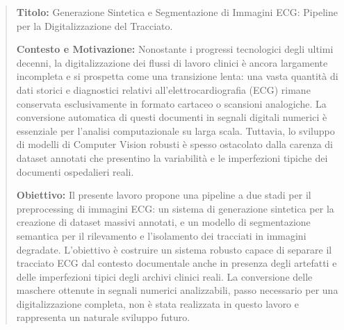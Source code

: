 \begin{abstract}
\textbf{Titolo:} Generazione Sintetica e Segmentazione di Immagini ECG: Pipeline per la Digitalizzazione del Tracciato.

\vspace{0.5cm}

\noindent \textbf{Contesto e Motivazione:} Nonostante i progressi tecnologici degli ultimi decenni, la digitalizzazione dei flussi di lavoro clinici è ancora largamente incompleta e si prospetta come una transizione lenta: una vasta quantità di dati storici e diagnostici relativi all'elettrocardiografia (ECG) rimane conservata esclusivamente in formato cartaceo o scansioni analogiche. La conversione automatica di questi documenti in segnali digitali numerici è essenziale per l'analisi computazionale su larga scala. Tuttavia, lo sviluppo di modelli di Computer Vision robusti è spesso ostacolato dalla carenza di dataset annotati che presentino la variabilità e le imperfezioni tipiche dei documenti ospedalieri reali.

\vspace{0.2cm}

\noindent \textbf{Obiettivo:} Il presente lavoro propone una pipeline a due stadi per il preprocessing di immagini ECG: un sistema di generazione sintetica per la creazione di dataset massivi annotati, e un modello di segmentazione semantica per il rilevamento e l'isolamento dei tracciati in immagini degradate. L'obiettivo è costruire un sistema robusto capace di separare il tracciato ECG dal contesto documentale anche in presenza degli artefatti e delle imperfezioni tipici degli archivi clinici reali. La conversione delle maschere ottenute in segnali numerici analizzabili, passo necessario per una digitalizzazione completa, non è stata realizzata in questo lavoro e rappresenta un naturale sviluppo futuro.

\vspace{0.2cm}


\end{abstract}
